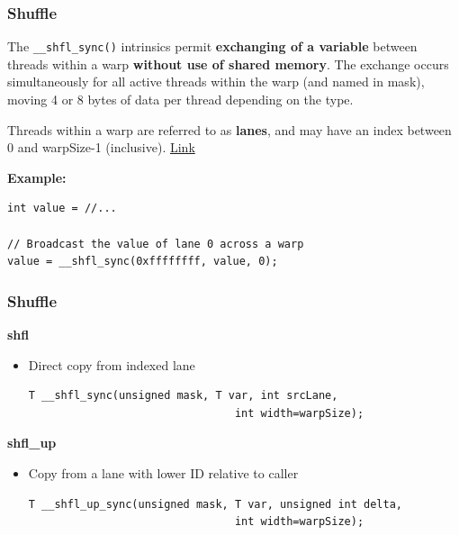 \documentclass[aspectratio=169,handout]{beamer}
\begin{document}
\begin{frame}[fragile]
\frametitle{Shuffle}

	\begin{mdframed}[frametitle={CUDA Programming Guide}]
The \texttt{\_\_shfl\_sync()} intrinsics permit \textbf{exchanging of a variable} between threads within a warp \textbf{without use of shared memory}. The exchange occurs simultaneously for all active threads within the warp (and named in mask), moving 4 or 8 bytes of data per thread depending on the type. 

Threads within a warp are referred to as \textbf{lanes}, and may have an index between 0 and warpSize-1 (inclusive). \href{https://docs.nvidia.com/cuda/cuda-c-programming-guide/index.html#warp-shuffle-functions}{Link}
\end{mdframed}
\vspace{0.5cm}
\textbf{Example:}
\begin{lstlisting}
int value = //...

// Broadcast the value of lane 0 across a warp
value = __shfl_sync(0xffffffff, value, 0);
\end{lstlisting}

\end{frame}


\begin{frame}[fragile]
\frametitle{Shuffle}

\textbf{shfl}
\begin{itemize}
	\item[] Direct copy from indexed lane
\begin{lstlisting}
T __shfl_sync(unsigned mask, T var, int srcLane, 
								int width=warpSize);
\end{lstlisting}
\end{itemize}

\textbf{shfl\_up}
\begin{itemize}
	\item[] Copy from a lane with lower ID relative to caller
\begin{lstlisting}
T __shfl_up_sync(unsigned mask, T var, unsigned int delta, 
								int width=warpSize);
\end{lstlisting}
\end{itemize}

\end{frame}
\end{document}
